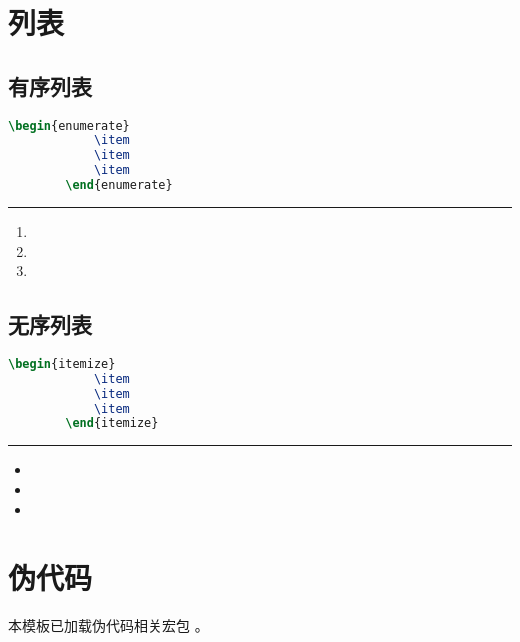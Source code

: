 \section{列表}
\subsection{有序列表}
\begin{minipage}[t]{0.48\textwidth}
	\begin{lstlisting}[language=TeX]
		\begin{enumerate}
			\item 
			\item 
			\item 
		\end{enumerate}
	\end{lstlisting} 
\end{minipage}
\begin{minipage}[t]{0.48\textwidth}
	\rule[-10pt]{10cm}{0em}
	\begin{enumerate}
		\item 
		\item 
		\item 
	\end{enumerate}
\end{minipage}
\subsection{无序列表}
\begin{minipage}[t]{0.48\textwidth}
	\begin{lstlisting}[language=TeX]
		\begin{itemize}
			\item 
			\item 
			\item 
		\end{itemize}
	\end{lstlisting} 
\end{minipage}
\begin{minipage}[t]{0.48\textwidth}
	\rule[-10pt]{10cm}{0em}
	\begin{itemize}
		\item 
		\item 
		\item 
	\end{itemize}
\end{minipage}
\section{伪代码}
本模板已加载伪代码相关宏包 。

